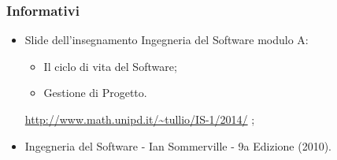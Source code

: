 \subsubsection{Informativi}
\begin{itemize}
\item Slide dell'insegnamento Ingegneria del Software modulo A:\\
\begin{itemize}
\item Il ciclo di vita del Software;
\item Gestione di Progetto.
\end{itemize}
\url{http://www.math.unipd.it/~tullio/IS-1/2014/} ;

\item Ingegneria del Software - Ian Sommerville - 9a Edizione (2010).
\end{itemize}

